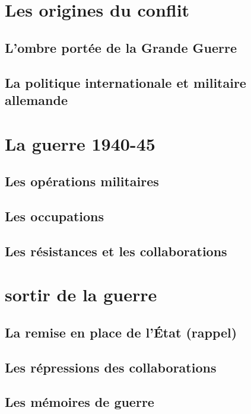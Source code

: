 \documentclass[12pt]{report}
\begin{document}
\section{Les origines du conflit}

\subsection{L'ombre portée de la Grande Guerre}

\subsection{La politique internationale et militaire allemande}

\section{La guerre 1940-45}

\subsection{Les opérations militaires}

\subsection{Les occupations}

\subsection{Les résistances et les collaborations}

\section{sortir de la guerre}

\subsection{La remise en place de l'État (rappel)}

\subsection{Les répressions des collaborations}

\subsection{Les mémoires de guerre}
\end{document}
